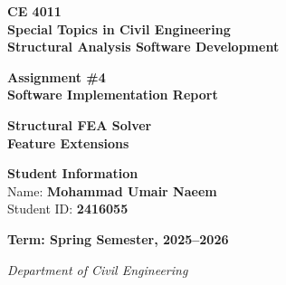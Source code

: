 \documentclass[12pt,a4paper]{article}
\begin{document}

\begin{titlepage}
    \centering
    \vspace*{2cm}
    
    {\Large \textbf{CE 4011}} \\
    {\Large \textbf{Special Topics in Civil Engineering}} \\
    {\Large \textbf{Structural Analysis Software Development}} \\
    \vspace{2cm}
    
    {\huge \textbf{Assignment \#4}} \\
    {\huge \textbf{Software Implementation Report}} \\
    \vspace{3cm}
    
    {\Large \textbf{Structural FEA Solver}} \\
    {\Large \textbf{Feature Extensions}} \\
    \vspace{3cm}
    
    \vfill
    
    {\Large \textbf{Student Information}} \\
    \vspace{1cm}
    {\large Name: \textbf{Mohammad Umair Naeem}} \\
    {\large Student ID: \textbf{2416055}} \\
    \vspace{2cm}
    
    {\Large \textbf{Term: Spring Semester, 2025--2026}} \\
    \vspace{1.5cm}
    
    {\large \textit{Department of Civil Engineering}} \\
    
\end{titlepage}


\end{document}
